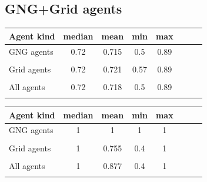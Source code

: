 \clearpage
                                       
\subsection{GNG+Grid agents}

\begin{center} 
  \begin{tabular}{l*{6}{c}r}
  Agent kind        & median & mean & min & max \\
  \hline
  GNG agents        & 0.72                  & 0.715                 & 0.5                 & 0.89  \\  
                    & \color{green}{+0.03}  & \color{green}{+0.024} & \color{red}{-0.02}  & \color{green}{+0.03} \\
  Grid agents       & 0.72                  & 0.721                 & 0.57                & 0.89  \\  
                    & \color{green}{+0.02}  & \color{green}{+0.021} & \color{green}{+0.02}& \color{red}{+0.02}   \\
  All agents        & 0.72                  & 0.718                 & 0.5                 & 0.89  \\
                    & \color{green}{+0.02}  & \color{green}{+0.020}  & \color{red}{-0.02}  & \color{green}{+0.02} 
  \end{tabular}                       
\end{center}

\begin{center}
  \begin{tabular}{l*{6}{c}r}
  Agent kind        & median & mean & min & max \\
  \hline
  GNG agents        & 1 & 1 & 1 & 1  \\   
                    & \\
  Grid agents       & 1 & 0.755                 & 0.4 & 1  \\  
                    &   & \color{green}{+0.008} & \color{green}{+0.01}  \\
  All agents        & 1 & 0.877               & 0.4 & 1  \\
                    &   & \color{red}{-0.039} & \color{green}{0.01} \\
  \end{tabular}                                 
\end{center}


